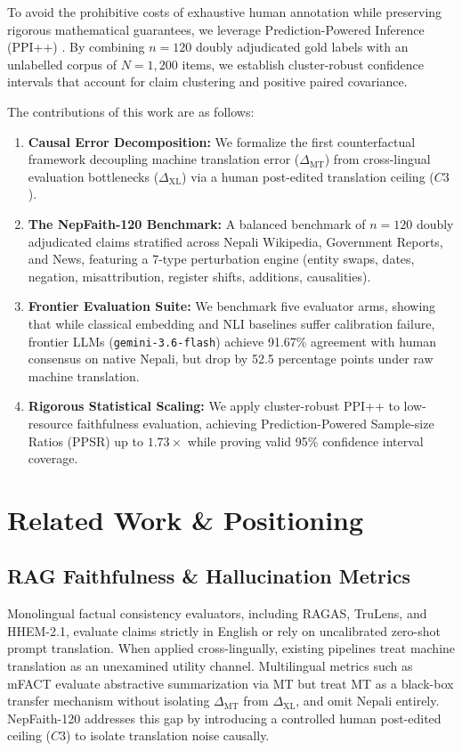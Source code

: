 \documentclass[conference]{IEEEtran}
\begin{document}
To avoid the prohibitive costs of exhaustive human annotation while preserving rigorous mathematical guarantees, we leverage Prediction-Powered Inference (PPI++) \cite{angelopoulos2023ppi, gao2026ppsr}. By combining $n=120$ doubly adjudicated gold labels with an unlabelled corpus of $N=1,200$ items, we establish cluster-robust confidence intervals that account for claim clustering and positive paired covariance.

The contributions of this work are as follows:
\begin{enumerate}
    \item \textbf{Causal Error Decomposition:} We formalize the first counterfactual framework decoupling machine translation error ($\Delta_{\text{MT}}$) from cross-lingual evaluation bottlenecks ($\Delta_{\text{XL}}$) via a human post-edited translation ceiling ($C3$).
    \item \textbf{The NepFaith-120 Benchmark:} A balanced benchmark of $n=120$ doubly adjudicated claims stratified across Nepali Wikipedia, Government Reports, and News, featuring a 7-type perturbation engine (entity swaps, dates, negation, misattribution, register shifts, additions, causalities).
    \item \textbf{Frontier Evaluation Suite:} We benchmark five evaluator arms, showing that while classical embedding and NLI baselines suffer calibration failure, frontier LLMs (\texttt{gemini-3.6-flash}) achieve 91.67\% agreement with human consensus on native Nepali, but drop by 52.5 percentage points under raw machine translation.
    \item \textbf{Rigorous Statistical Scaling:} We apply cluster-robust PPI++ to low-resource faithfulness evaluation, achieving Prediction-Powered Sample-size Ratios (PPSR) up to $1.73\times$ while proving valid 95\% confidence interval coverage.
\end{enumerate}

\section{Related Work \& Positioning}
\label{sec:related}
\subsection{RAG Faithfulness \& Hallucination Metrics}
Monolingual factual consistency evaluators, including RAGAS, TruLens, and HHEM-2.1, evaluate claims strictly in English or rely on uncalibrated zero-shot prompt translation. When applied cross-lingually, existing pipelines treat machine translation as an unexamined utility channel. Multilingual metrics such as mFACT evaluate abstractive summarization via MT but treat MT as a black-box transfer mechanism without isolating $\Delta_{\text{MT}}$ from $\Delta_{\text{XL}}$, and omit Nepali entirely. NepFaith-120 addresses this gap by introducing a controlled human post-edited ceiling ($C3$) to isolate translation noise causally.
\end{document}
